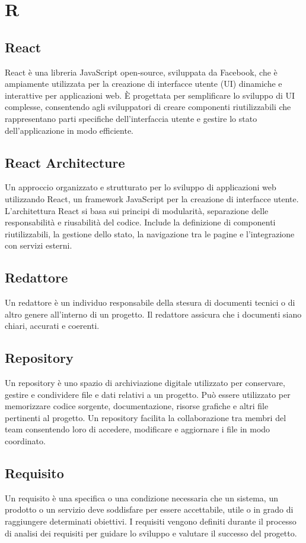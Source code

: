 \section*{R} 
\subsection*{React} 
React è una libreria JavaScript open-source, sviluppata da Facebook, che è ampiamente utilizzata per la creazione di interfacce utente (UI) dinamiche e interattive per applicazioni web. È progettata per semplificare lo sviluppo di UI complesse, consentendo agli sviluppatori di creare componenti riutilizzabili che rappresentano parti specifiche dell'interfaccia utente e gestire lo stato dell'applicazione in modo efficiente.
\subsection*{React Architecture} 
Un approccio organizzato e strutturato per lo sviluppo di applicazioni web utilizzando React, un framework JavaScript per la creazione di interfacce utente. L'architettura React si basa sui principi di modularità, separazione delle responsabilità e riusabilità del codice. Include la definizione di componenti riutilizzabili, la gestione dello stato, la navigazione tra le pagine e l'integrazione con servizi esterni.
\subsection*{Redattore} 
Un redattore è un individuo responsabile della stesura di documenti tecnici o di altro genere all'interno di un progetto. Il redattore assicura che i documenti siano chiari, accurati e coerenti. 
\subsection*{Repository} 
Un repository è uno spazio di archiviazione digitale utilizzato per conservare, gestire e condividere file e dati relativi a un progetto. Può essere utilizzato per memorizzare codice sorgente, documentazione, risorse grafiche e altri file pertinenti al progetto. Un repository facilita la collaborazione tra membri del team consentendo loro di accedere, modificare e aggiornare i file in modo coordinato. 
\subsection*{Requisito} 
Un requisito è una specifica o una condizione necessaria che un sistema, un prodotto o un servizio deve soddisfare per essere accettabile, utile o in grado di raggiungere determinati obiettivi. I requisiti vengono definiti durante il processo di analisi dei requisiti per guidare lo sviluppo e valutare il successo del progetto. 
